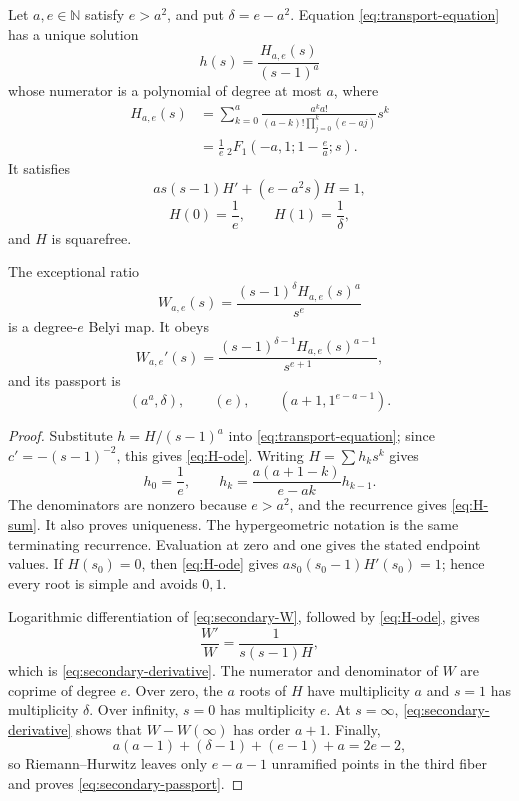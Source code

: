 \documentclass[11pt,reqno]{amsart}
\begin{document}
\begin{theorem}
\label{thm:secondary}
Let \(a,e\in\mathbb N\) satisfy \(e>a^2\), and put
\(\delta=e-a^2\).  Equation \eqref{eq:transport-equation} has a unique
solution
\[
h(s)=\frac{H_{a,e}(s)}{(s-1)^a}
\]
whose numerator is a polynomial of degree at most \(a\), where
\begin{align}
H_{a,e}(s)
&=\sum_{k=0}^a
\frac{a^k a!}{(a-k)!\prod_{j=0}^k(e-aj)}s^k
\label{eq:H-sum}\\
&=\frac1e\,{}_2F_1\!\left(-a,1;1-\frac ea;s\right).
\label{eq:H-hypergeometric}
\end{align}
It satisfies
\begin{equation}
\label{eq:H-ode}
as(s-1)H'+(e-a^2s)H=1,
\end{equation}
\[
H(0)=\frac1e,\qquad H(1)=\frac1\delta,
\]
and \(H\) is squarefree.

The exceptional ratio
\begin{equation}
\label{eq:secondary-W}
W_{a,e}(s)=\frac{(s-1)^\delta H_{a,e}(s)^a}{s^e}
\end{equation}
is a degree-\(e\) Belyi map.  It obeys
\begin{equation}
\label{eq:secondary-derivative}
W_{a,e}'(s)=
\frac{(s-1)^{\delta-1}H_{a,e}(s)^{a-1}}{s^{e+1}},
\end{equation}
and its passport is
\begin{equation}
\label{eq:secondary-passport}
(a^a,\delta),\qquad(e),\qquad(a+1,1^{e-a-1}).
\end{equation}
\end{theorem}

\begin{proof}
Substitute \(h=H/(s-1)^a\) into
\eqref{eq:transport-equation}; since \(c'=-(s-1)^{-2}\), this gives
\eqref{eq:H-ode}.  Writing \(H=\sum h_ks^k\) gives
\[
h_0=\frac1e,\qquad
h_k=\frac{a(a+1-k)}{e-ak}h_{k-1}.
\]
The denominators are nonzero because \(e>a^2\), and the recurrence gives
\eqref{eq:H-sum}.  It also proves uniqueness.  The hypergeometric notation
is the same terminating recurrence.  Evaluation at zero and one gives the
stated endpoint values.  If \(H(s_0)=0\), then
\eqref{eq:H-ode} gives \(as_0(s_0-1)H'(s_0)=1\); hence every root is simple
and avoids \(0,1\).

Logarithmic differentiation of \eqref{eq:secondary-W}, followed by
\eqref{eq:H-ode}, gives
\[
\frac{W'}W=\frac1{s(s-1)H},
\]
which is \eqref{eq:secondary-derivative}.  The numerator and denominator of
\(W\) are coprime of degree \(e\).  Over zero, the \(a\) roots of \(H\)
have multiplicity \(a\) and \(s=1\) has multiplicity \(\delta\).  Over
infinity, \(s=0\) has multiplicity \(e\).  At \(s=\infty\),
\eqref{eq:secondary-derivative} shows that
\(W-W(\infty)\) has order \(a+1\).  Finally,
\[
a(a-1)+(\delta-1)+(e-1)+a=2e-2,
\]
so Riemann--Hurwitz leaves only \(e-a-1\) unramified points in the third
fiber and proves \eqref{eq:secondary-passport}.
\end{proof}
\end{document}
